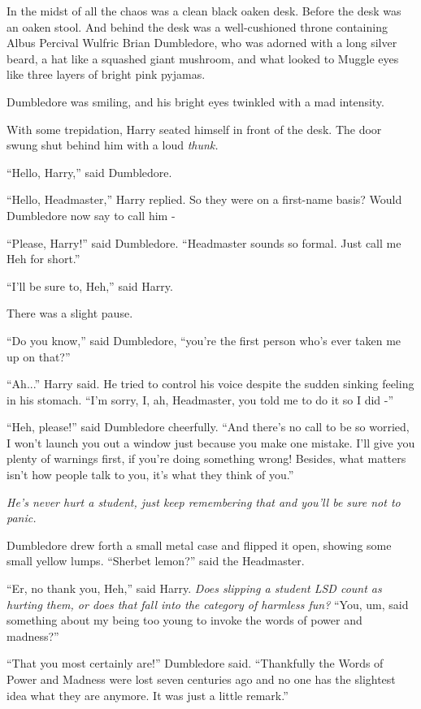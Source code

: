 In the midst of all the chaos was a clean black oaken desk. Before the
desk was an oaken stool. And behind the desk was a well-cushioned throne
containing Albus Percival Wulfric Brian Dumbledore, who was adorned with
a long silver beard, a hat like a squashed giant mushroom, and what
looked to Muggle eyes like three layers of bright pink pyjamas.

Dumbledore was smiling, and his bright eyes twinkled with a mad
intensity.

With some trepidation, Harry seated himself in front of the desk. The
door swung shut behind him with a loud \emph{thunk.}

``Hello, Harry,'' said Dumbledore.

``Hello, Headmaster,'' Harry replied. So they were on a first-name
basis? Would Dumbledore now say to call him -

``Please, Harry!'' said Dumbledore. ``Headmaster sounds so formal. Just
call me Heh for short.''

``I'll be sure to, Heh,'' said Harry.

There was a slight pause.

``Do you know,'' said Dumbledore, ``you're the first person who's ever
taken me up on that?''

``Ah...'' Harry said. He tried to control his voice despite the
sudden sinking feeling in his stomach. ``I'm sorry, I, ah, Headmaster,
you told me to do it so I did -''

``Heh, please!'' said Dumbledore cheerfully. ``And there's no call to be
so worried, I won't launch you out a window just because you make one
mistake. I'll give you plenty of warnings first, if you're doing
something wrong! Besides, what matters isn't how people talk to you,
it's what they think of you.''

\emph{He's never hurt a student, just keep remembering that and you'll
be sure not to panic.}

Dumbledore drew forth a small metal case and flipped it open, showing
some small yellow lumps. ``Sherbet lemon?'' said the Headmaster.

``Er, no thank you, Heh,'' said Harry. \emph{Does slipping a student LSD
count as hurting them, or does that fall into the category of harmless
fun?} ``You, um, said something about my being too young to invoke the
words of power and madness?''

``That you most certainly are!'' Dumbledore said. ``Thankfully the Words
of Power and Madness were lost seven centuries ago and no one has the
slightest idea what they are anymore. It was just a little remark.''

